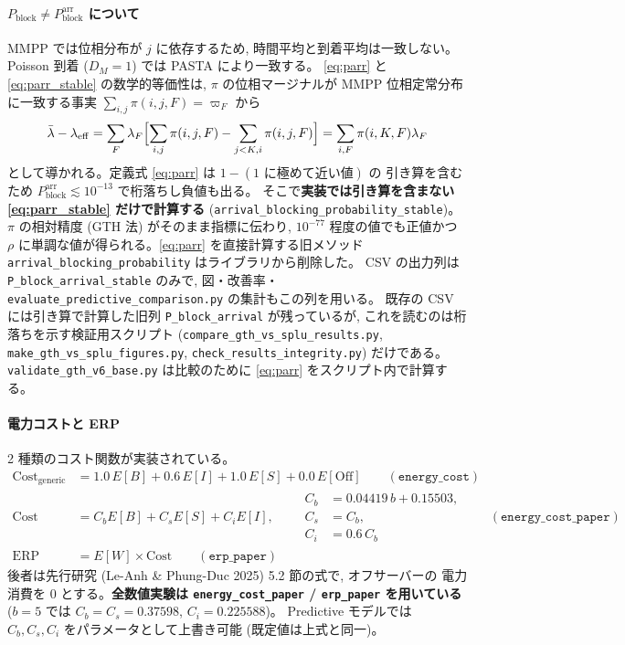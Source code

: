 \documentclass[a4paper,11pt]{article}
\newcommand{\code}[1]{\texttt{#1}}
\newcommand{\eff}{\mathrm{eff}}
\newcommand{\blk}{\mathrm{block}}
\begin{document}
\paragraph{$P_\blk \ne P_\blk^{\mathrm{arr}}$ について}
MMPP では位相分布が $j$ に依存するため, 時間平均と到着平均は一致しない。
Poisson 到着 ($D_M=1$) では PASTA により一致する。
\eqref{eq:parr} と \eqref{eq:parr_stable} の数学的等価性は,
$\pi$ の位相マージナルが MMPP 位相定常分布に一致する事実
$\sum_{i,j}\pi(i,j,F)=\varpi_F$ から
\begin{equation}
  \bar\lambda-\lambda_\eff
  =\sum_F \lambda_F\Bigl[\sum_{i,j}\pi(i,j,F)-\sum_{j<K,i}\pi(i,j,F)\Bigr]
  =\sum_{i,F}\pi(i,K,F)\lambda_F
\end{equation}
として導かれる。定義式 \eqref{eq:parr} は $1-(\text{1 に極めて近い値})$ の
引き算を含むため $P_\blk^{\mathrm{arr}}\lesssim10^{-13}$ で桁落ちし負値も出る。
そこで\textbf{実装では引き算を含まない \eqref{eq:parr_stable} だけで計算する}
(\code{arrival\_blocking\_probability\_stable})。
$\pi$ の相対精度 (GTH 法) がそのまま指標に伝わり, $10^{-77}$ 程度の値でも正値かつ
$\rho$ に単調な値が得られる。\eqref{eq:parr} を直接計算する旧メソッド
\code{arrival\_blocking\_probability} はライブラリから削除した。
CSV の出力列は \code{P\_block\_arrival\_stable} のみで,
図・改善率・\code{evaluate\_predictive\_comparison.py} の集計もこの列を用いる。
既存の CSV には引き算で計算した旧列 \code{P\_block\_arrival} が残っているが,
これを読むのは桁落ちを示す検証用スクリプト
(\code{compare\_gth\_vs\_splu\_results.py}, \code{make\_gth\_vs\_splu\_figures.py},
\code{check\_results\_integrity.py}) だけである。
\code{validate\_gth\_v6\_base.py} は比較のために \eqref{eq:parr} をスクリプト内で計算する。

\paragraph{電力コストと ERP}
2 種類のコスト関数が実装されている。
\begin{align}
  \mathrm{Cost}_{\mathrm{generic}} &=
  1.0\,E[B]+0.6\,E[I]+1.0\,E[S]+0.0\,E[\mathrm{Off}]
  \qquad(\code{energy\_cost}) \\
  \mathrm{Cost} &= C_b E[B]+C_s E[S]+C_i E[I],\qquad
  \begin{aligned}
    C_b &= 0.04419\,b+0.15503,\\ C_s &= C_b,\\ C_i &= 0.6\,C_b
  \end{aligned}
  \qquad(\code{energy\_cost\_paper})\\
  \mathrm{ERP} &= E[W]\times \mathrm{Cost}
  \qquad(\code{erp\_paper})
\end{align}
後者は先行研究 (Le-Anh \& Phung-Duc 2025) 5.2 節の式で, オフサーバーの
電力消費を $0$ とする。\textbf{全数値実験は \code{energy\_cost\_paper} /
\code{erp\_paper} を用いている} ($b=5$ では $C_b=C_s=0.37598$, $C_i=0.225588$)。
Predictive モデルでは $C_b,C_s,C_i$ をパラメータとして上書き可能
(既定値は上式と同一)。
\end{document}
